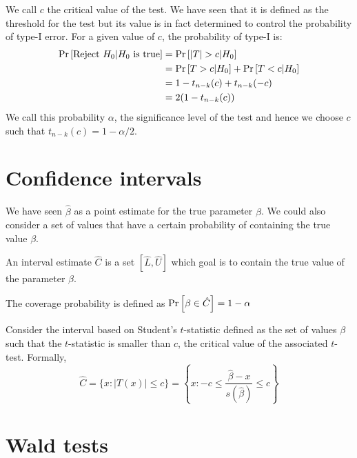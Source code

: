 We call $c$ the critical value of the test. We have seen that it is defined as the threshold for the test but its value is in fact determined to control the probability of type-I error. For a given value of $c$, the probability of type-I is:\begin{align*}
\operatorname{Pr}\left[\text{Reject }H_0\vert H_0\text{ is true}\right] & = \operatorname{Pr}\left[\vert T\vert >c\vert H_0\right] \\
& = \operatorname{Pr}\left[T>c\vert H_0\right] + \operatorname{Pr}\left[T<c\vert H_0\right] \\
& = 1 - t_{n-k}(c) + t_{n-k}(-c) \\
& = 2(1 - t_{n-k}(c))
\end{align*} We call this probability $\alpha$, the significance level of the test and hence we choose $c$ such that $t_{n-k}(c) = 1 - \alpha /2$.

\section{Confidence intervals}

We have seen $\hat\beta$ as a point estimate for the true parameter $\beta$. We could also consider a set of values that have a certain probability of containing the true value $\beta$.

\begin{definition}
An interval estimate $\hat C$ is a set $\left[\hat L, \hat U\right]$ which goal is to contain the true value of the parameter $\beta$. 
\end{definition}

\begin{definition}
The coverage probability is defined as $\operatorname{Pr}\left[\beta\in\hat C\right] = 1 -\alpha $
\end{definition}

\begin{proposition}
Consider the interval based on Student's $t$-statistic defined as the set of values $\beta$ such that the $t$-statistic is smaller than $c$, the critical value of the associated $t$-test. Formally, $$\hat C = \{x : \vert T(x)\vert \leq c\} = \left\lbrace x : -c\leq \frac{\hat{\beta} - x}{s(\hat\beta)} \leq c\right\rbrace $$
\end{proposition}

\section{Wald tests}

